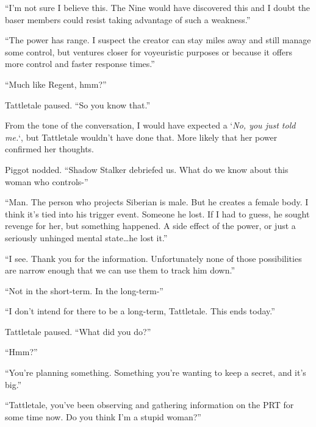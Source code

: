``I'm not sure I believe this.  The Nine would have discovered this and I doubt the baser members could resist taking advantage of such a weakness.''



``The power has range.  I suspect the creator can stay miles away and still manage some control, but ventures closer for voyeuristic purposes or because it offers more control and faster response times.''



``Much like Regent, hmm?''



Tattletale paused.  ``So you know that.''



From the tone of the conversation, I would have expected a `\emph{No, you just told me.}`, but Tattletale wouldn't have done that.  More likely that her power confirmed her thoughts.



Piggot nodded.  ``Shadow Stalker debriefed us.  What do we know about this woman who controls-''



``Man.  The person who projects Siberian is male.  But he creates a female body.  I think it's tied into his trigger event.  Someone he lost.  If I had to guess, he sought revenge for her, but something happened.  A side effect of the power, or just a seriously unhinged mental state\ldots he lost it.''



``I see.  Thank you for the information.  Unfortunately none of those possibilities are narrow enough that we can use them to track him down.''



``Not in the short-term.  In the long-term-''



``I don't intend for there to be a long-term, Tattletale.  This ends today.''



Tattletale paused.  ``What did you do?''



``Hmm?''



``You're planning something.  Something you're wanting to keep a secret, and it's big.''



``Tattletale, you've been observing and gathering information on the PRT for some time now.  Do you think I'm a stupid woman?''



